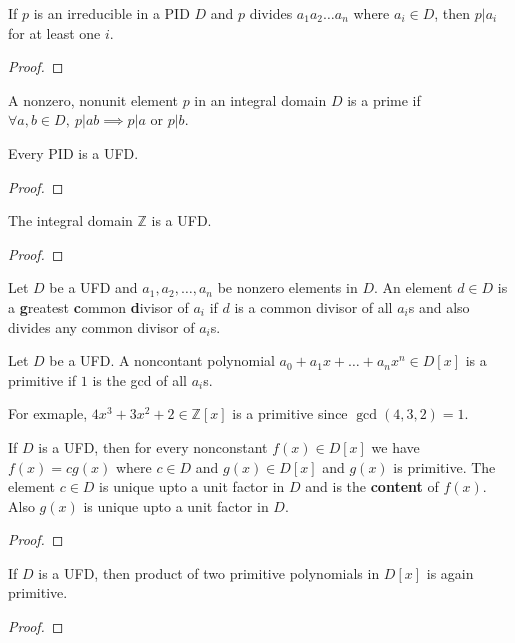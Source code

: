 \begin{corollary}
	If $p$ is an irreducible in a PID $D$ and $p$ divides $a_1a_2\dots a_n$ where $a_i \in D$, then $p|a_i$ for at least one $i$.
\end{corollary}
\begin{proof}
\end{proof}

\begin{definition}
	A nonzero, nonunit element $p$ in an integral domain $D$ is a prime if $\forall a,b \in D,\ p|ab \implies p|a \text{ or } p|b$.
\end{definition}

\begin{theorem}
	Every PID is a UFD.
\end{theorem}
\begin{proof}
\end{proof}

\begin{corollary}
	The integral domain $\mathbb{Z}$ is a UFD.
\end{corollary}
\begin{proof}
\end{proof}

\begin{definition}
	Let $D$ be a UFD and $a_1,a_2,\dots,a_n$ be nonzero elements in $D$.
	An element $d \in D$ is a \textbf{g}reatest \textbf{c}ommon \textbf{d}ivisor of $a_i$ if $d$ is a common divisor of all $a_i$s and also divides any common divisor of $a_i$s.
\end{definition}

\begin{definition}
	Let $D$ be a UFD.
	A noncontant polynomial $a_0 + a_1x + \dots + a_nx^n \in D[x]$ is a primitive if $1$ is the gcd of all $a_i$s.
\end{definition}
	For exmaple, $4x^3+3x^2+2 \in \mathbb{Z}[x]$ is a primitive since $\gcd(4,3,2) = 1$.

\begin{lemma}
	If $D$ is a UFD, then for every nonconstant $f(x) \in D[x]$ we have $f(x) = cg(x)$ where $c \in D$ and $g(x) \in D[x]$ and $g(x)$ is primitive.
	The element $c \in D$ is unique upto a unit factor in $D$ and is the \textbf{content} of $f(x)$.
	Also $g(x)$ is unique upto a unit factor in $D$.
\end{lemma}
\begin{proof}
\end{proof}

\begin{lemma}[Gauss]
	If $D$ is a UFD, then product of two primitive polynomials in $D[x]$ is again primitive.
\end{lemma}
\begin{proof}
\end{proof}

